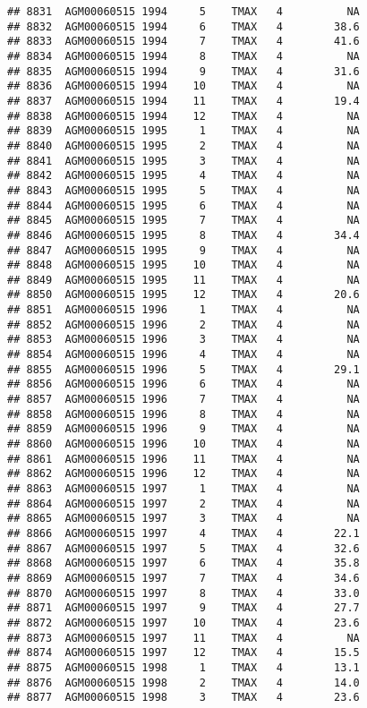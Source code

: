 \documentclass{article}\usepackage[]{graphicx}\usepackage[]{color}
\makeatletter
\newenvironment{kframe}{%
 \def\at@end@of@kframe{}%
 \ifinner\ifhmode%
  \def\at@end@of@kframe{\end{minipage}}%
  \begin{minipage}{\columnwidth}%
 \fi\fi%
 \def\FrameCommand##1{\hskip\@totalleftmargin \hskip-\fboxsep
 \colorbox{shadecolor}{##1}\hskip-\fboxsep
     \hskip-\linewidth \hskip-\@totalleftmargin \hskip\columnwidth}%
 \MakeFramed {\advance\hsize-\width
   \@totalleftmargin\z@ \linewidth\hsize
   \@setminipage}}%
 {\par\unskip\endMakeFramed%
 \at@end@of@kframe}
\newenvironment{knitrout}{}{} %
\makeatother
\begin{document}
\begin{knitrout}
\begin{kframe}
\begin{verbatim}
## 8831  AGM00060515 1994     5    TMAX   4          NA
## 8832  AGM00060515 1994     6    TMAX   4        38.6
## 8833  AGM00060515 1994     7    TMAX   4        41.6
## 8834  AGM00060515 1994     8    TMAX   4          NA
## 8835  AGM00060515 1994     9    TMAX   4        31.6
## 8836  AGM00060515 1994    10    TMAX   4          NA
## 8837  AGM00060515 1994    11    TMAX   4        19.4
## 8838  AGM00060515 1994    12    TMAX   4          NA
## 8839  AGM00060515 1995     1    TMAX   4          NA
## 8840  AGM00060515 1995     2    TMAX   4          NA
## 8841  AGM00060515 1995     3    TMAX   4          NA
## 8842  AGM00060515 1995     4    TMAX   4          NA
## 8843  AGM00060515 1995     5    TMAX   4          NA
## 8844  AGM00060515 1995     6    TMAX   4          NA
## 8845  AGM00060515 1995     7    TMAX   4          NA
## 8846  AGM00060515 1995     8    TMAX   4        34.4
## 8847  AGM00060515 1995     9    TMAX   4          NA
## 8848  AGM00060515 1995    10    TMAX   4          NA
## 8849  AGM00060515 1995    11    TMAX   4          NA
## 8850  AGM00060515 1995    12    TMAX   4        20.6
## 8851  AGM00060515 1996     1    TMAX   4          NA
## 8852  AGM00060515 1996     2    TMAX   4          NA
## 8853  AGM00060515 1996     3    TMAX   4          NA
## 8854  AGM00060515 1996     4    TMAX   4          NA
## 8855  AGM00060515 1996     5    TMAX   4        29.1
## 8856  AGM00060515 1996     6    TMAX   4          NA
## 8857  AGM00060515 1996     7    TMAX   4          NA
## 8858  AGM00060515 1996     8    TMAX   4          NA
## 8859  AGM00060515 1996     9    TMAX   4          NA
## 8860  AGM00060515 1996    10    TMAX   4          NA
## 8861  AGM00060515 1996    11    TMAX   4          NA
## 8862  AGM00060515 1996    12    TMAX   4          NA
## 8863  AGM00060515 1997     1    TMAX   4          NA
## 8864  AGM00060515 1997     2    TMAX   4          NA
## 8865  AGM00060515 1997     3    TMAX   4          NA
## 8866  AGM00060515 1997     4    TMAX   4        22.1
## 8867  AGM00060515 1997     5    TMAX   4        32.6
## 8868  AGM00060515 1997     6    TMAX   4        35.8
## 8869  AGM00060515 1997     7    TMAX   4        34.6
## 8870  AGM00060515 1997     8    TMAX   4        33.0
## 8871  AGM00060515 1997     9    TMAX   4        27.7
## 8872  AGM00060515 1997    10    TMAX   4        23.6
## 8873  AGM00060515 1997    11    TMAX   4          NA
## 8874  AGM00060515 1997    12    TMAX   4        15.5
## 8875  AGM00060515 1998     1    TMAX   4        13.1
## 8876  AGM00060515 1998     2    TMAX   4        14.0
## 8877  AGM00060515 1998     3    TMAX   4        23.6

\end{verbatim}
\end{kframe}
\end{knitrout}
\end{document}
